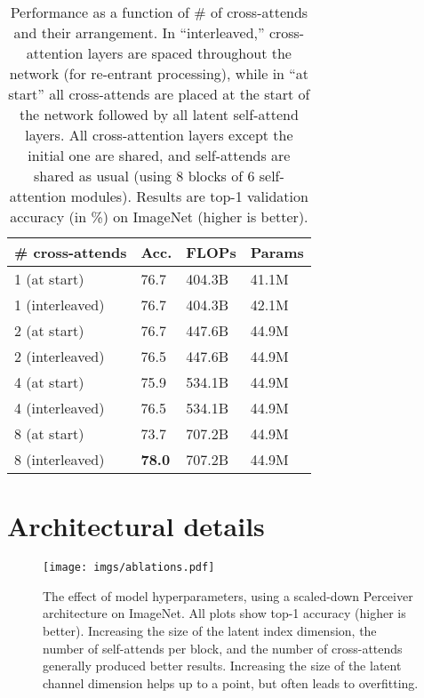 \documentclass{article}
\begin{document}
\begin{table}[t]
\centering
\begin{tabular}{|l|l|l|l|}
\hline
\# cross-attends        & Acc.          & FLOPs   & Params \\ \hline
1 (at start)            & 76.7          & 404.3B  & 41.1M   \\ 
1 (interleaved)         & 76.7          & 404.3B  & 42.1M   \\ \hline
2 (at start)            & 76.7          & 447.6B  & 44.9M   \\ 
2 (interleaved)         & 76.5          & 447.6B  & 44.9M   \\ \hline
4 (at start)            & 75.9          & 534.1B  & 44.9M   \\ 
4 (interleaved)         & 76.5          & 534.1B  & 44.9M   \\ \hline
8 (at start)            & 73.7          & 707.2B  & 44.9M   \\ 
8 (interleaved)         & \textbf{78.0} & 707.2B  & 44.9M   \\ \hline
\end{tabular}
\vspace{-8pt}
\caption{Performance as a function of \# of cross-attends and their arrangement. In ``interleaved,'' cross-attention layers are spaced throughout the network (for re-entrant processing), while in ``at start'' all cross-attends are placed at the start of the network followed by all latent self-attend layers. All cross-attention layers except the initial one are shared, and self-attends are shared as usual (using 8 blocks of 6 self-attention modules). Results are top-1 validation accuracy (in \%) on ImageNet (higher is better).}
\label{tab:cross_attend_config}
\vspace{-12pt}
\end{table}


\section{Architectural details}
\label{sec:supp_arch_details}

\begin{figure*}[t]
    \centering
    \texttt{[image: imgs/ablations.pdf]}
    \vspace{-8pt}
    \caption{The effect of model hyperparameters, using a scaled-down Perceiver architecture on ImageNet. All plots show top-1 accuracy (higher is better). Increasing the size of the latent index dimension, the number of self-attends per block, and the number of cross-attends generally produced better results. Increasing the size of the latent channel dimension helps up to a point, but often leads to overfitting.}
    \label{fig:ablation}
\end{figure*}
\end{document}

